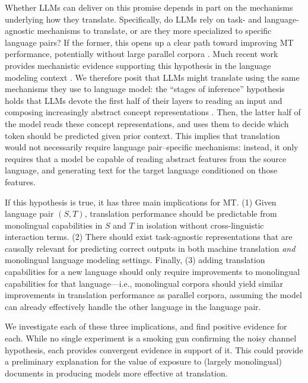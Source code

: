 \documentclass[11pt]{article}
\newcommand{\am}[1]{\textcolor{orange}{[AM: #1]}}
\begin{document}
Whether LLMs can deliver on this promise depends in part on the mechanisms underlying how they translate. Specifically, do LLMs rely on task- and language-agnostic mechanisms to translate, or are they more specialized to specific language pairs? If the former, this opens up a clear path toward improving MT performance, potentially without large parallel corpora \citep{artetxe2018unsupervised}. Much recent work provides mechanistic evidence supporting this hypothesis in the language modeling context \citep{wendler-etal-2024-llamas,brinkmann-etal-2025-large,wu2025the}. We therefore posit that LLMs might translate using the same mechanisms they use to language model: the ``stages of inference'' hypothesis  \citep{lad2024the} holds that LLMs devote the first half of their layers to reading an input and composing increasingly abstract concept representations . Then, the latter half of the model reads these concept representations, and uses them to decide which token should be predicted given prior context. This implies that translation would not necessarily require language pair--specific mechanisms: instead, it only requires that a model be capable of reading abstract features from the source language, and generating text for the target language conditioned on those features.

If this hypothesis is true, it has three main implications for MT. (1) Given language pair $(S,T)$, translation performance should be predictable from monolingual capabilities in $S$ and $T$ in isolation without cross-linguistic interaction terms. (2) There should exist task-agnostic representations that are causally relevant for predicting correct outputs in both machine translation \emph{and} monolingual language modeling settings. Finally, (3) adding translation capabilities for a new language should only require improvements to monolingual capabilities for that language---i.e., monolingual corpora should yield similar improvements in translation performance as parallel corpora, assuming the model can already effectively handle the other language in the language pair.

We investigate each of these three implications, and find positive evidence for each. While no single experiment is a smoking gun confirming the noisy channel hypothesis, each provides convergent evidence in support of it. This could provide a preliminary explanation for the value of exposure to (largely monolingual) documents in producing models more effective at translation.
\end{document}
